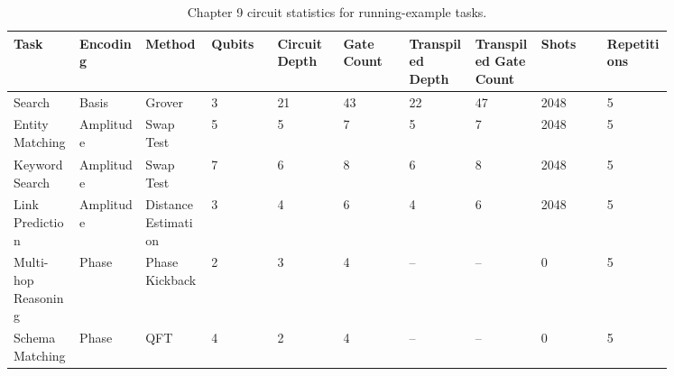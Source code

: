 \begin{table}[t]
\centering
\scriptsize
\setlength{\tabcolsep}{2pt}
\renewcommand{\arraystretch}{1.08}
\caption{Chapter 9 circuit statistics for running-example tasks.}
\label{tab:chapter9-circuit-statistics}
\begin{tabular}{@{}p{0.085\linewidth}p{0.085\linewidth}p{0.085\linewidth}p{0.085\linewidth}p{0.085\linewidth}p{0.085\linewidth}p{0.085\linewidth}p{0.085\linewidth}p{0.085\linewidth}p{0.085\linewidth}@{}}
\hline
Task & Encoding & Method & Qubits & Circuit Depth & Gate Count & Transpiled Depth & Transpiled Gate Count & Shots & Repetitions \\
\hline
Search & Basis & Grover & 3 & 21 & 43 & 22 & 47 & 2048 & 5 \\
Entity Matching & Amplitude & Swap Test & 5 & 5 & 7 & 5 & 7 & 2048 & 5 \\
Keyword Search & Amplitude & Swap Test & 7 & 6 & 8 & 6 & 8 & 2048 & 5 \\
Link Prediction & Amplitude & Distance Estimation & 3 & 4 & 6 & 4 & 6 & 2048 & 5 \\
Multi-hop Reasoning & Phase & Phase Kickback & 2 & 3 & 4 & -- & -- & 0 & 5 \\
Schema Matching & Phase & QFT & 4 & 2 & 4 & -- & -- & 0 & 5 \\
\hline
\end{tabular}
\end{table}
